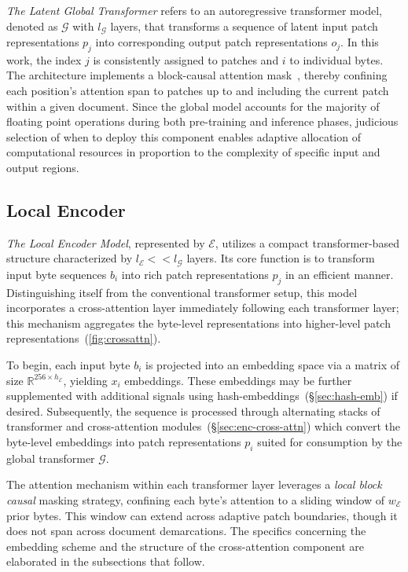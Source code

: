 \textit{The Latent Global Transformer} refers to an autoregressive transformer model, denoted as $\mathcal{G}$ with $l_{\mathcal{G}}$ layers, that transforms a sequence of latent input patch representations $p_j$ into corresponding output patch representations $o_j$. In this work, the index $j$ is consistently assigned to patches and $i$ to individual bytes. The architecture implements a block-causal attention mask~\citep{dubey2024llama}, thereby confining each position’s attention span to patches up to and including the current patch within a given document. Since the global model accounts for the majority of floating point operations during both pre-training and inference phases, judicious selection of when to deploy this component enables adaptive allocation of computational resources in proportion to the complexity of specific input and output regions.

\subsection{Local Encoder}
\label{section:local}

\textit{The Local Encoder Model}, represented by $\mathcal{E}$, utilizes a compact transformer-based structure characterized by $l_{\mathcal{E}} << l_{\mathcal{G}}$ layers. Its core function is to transform input byte sequences $b_i$ into rich patch representations $p_j$ in an efficient manner. Distinguishing itself from the conventional transformer setup, this model incorporates a cross-attention layer immediately following each transformer layer; this mechanism aggregates the byte-level representations into higher-level patch representations~(\autoref{fig:crossattn}).

To begin, each input byte $b_i$ is projected into an embedding space via a matrix of size $\mathbb{R}^{256 \times h_{\mathcal{E}}}$, yielding $x_i$ embeddings. These embeddings may be further supplemented with additional signals using hash-embeddings~(\S\ref{sec:hash-emb}) if desired. Subsequently, the sequence is processed through alternating stacks of transformer and cross-attention modules~(\S\ref{sec:enc-cross-attn}) which convert the byte-level embeddings into patch representations $p_i$ suited for consumption by the global transformer $\mathcal{G}$.

The attention mechanism within each transformer layer leverages a \textit{local block causal} masking strategy, confining each byte's attention to a sliding window of $w_{\mathcal{E}}$ prior bytes. This window can extend across adaptive patch boundaries, though it does not span across document demarcations. The specifics concerning the embedding scheme and the structure of the cross-attention component are elaborated in the subsections that follow.

